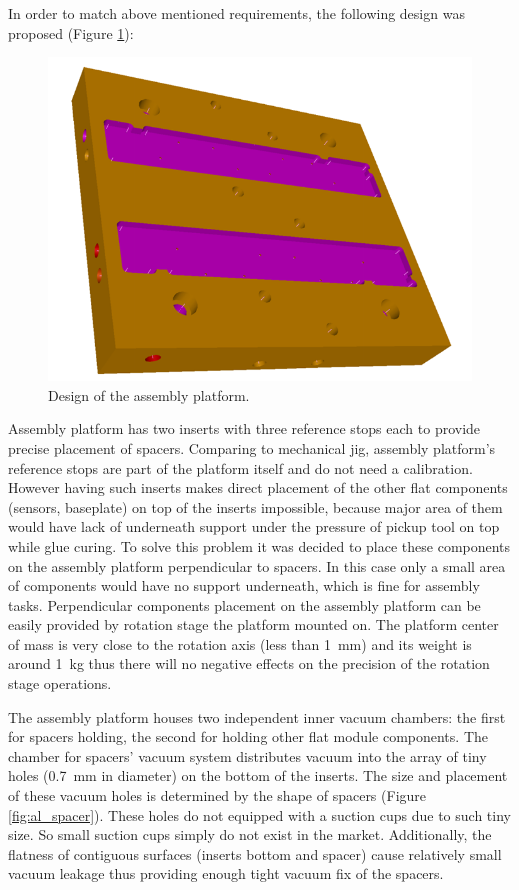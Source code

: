 In order to match above mentioned requirements, the following design was proposed (Figure \ref{fig:platform_design}):

\begin{figure}[ht]\centering
\includegraphics[width=0.7\linewidth]{Data/Module_assembly/Platform_design.png}
\caption{Design of the assembly platform.}
\label{fig:platform_design}
\end{figure}

Assembly platform has two inserts with three reference stops each to provide precise placement of spacers. Comparing to mechanical jig, assembly platform's reference stops are part of the platform itself and do not need a calibration. However having such inserts makes direct placement of the other flat components (sensors, baseplate) on top of the inserts impossible, because major area of them would have lack of underneath support under the pressure of pickup tool on top while glue curing. To solve this problem it was decided to place these components on the assembly platform perpendicular to spacers. In this case only a small area of components would have no support underneath, which is fine for assembly tasks. Perpendicular components placement on the assembly platform can be easily provided by rotation stage the platform mounted on. The platform center of mass is very close to the rotation axis (less than 1~mm) and its weight is around 1~kg thus there will no negative effects on the precision of the rotation stage operations. 

The assembly platform houses two independent inner vacuum chambers: the first for spacers holding, the second for holding other flat module components. The chamber for spacers' vacuum system distributes vacuum into the array of tiny holes (0.7~mm in diameter) on the bottom of the inserts. The size and placement of these vacuum holes is determined by the shape of spacers (Figure \ref{fig:al_spacer}). These holes do not equipped with a suction cups due to such tiny size. So small suction cups simply do not exist in the market. Additionally, the flatness of contiguous surfaces (inserts bottom and spacer) cause relatively small vacuum leakage thus providing enough tight vacuum fix of the spacers.

